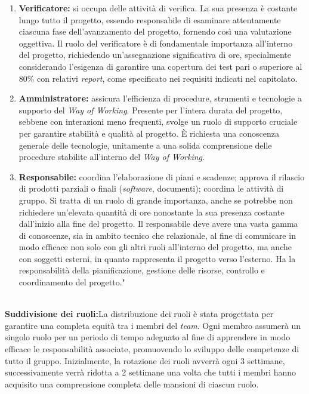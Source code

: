\begin{enumerate}
\item \textbf{Verificatore:} si occupa delle attività di verifica. 
La sua presenza è costante lungo tutto il progetto, essendo responsabile di esaminare attentamente ciascuna 
fase dell'avanzamento del progetto, fornendo così una valutazione oggettiva. 
Il ruolo del verificatore è di fondamentale importanza all'interno del progetto, richiedendo un'assegnazione 
significativa di ore, specialmente considerando l'esigenza di garantire una copertura dei test pari o superiore 
al 80\% con relativi \textit{report}, come specificato nei requisiti indicati nel capitolato.

\item \textbf{Amministratore:} assicura l'efficienza di procedure, strumenti e tecnologie a supporto del 
\textit{Way of Working}.
Presente per l'intera durata del progetto, sebbene con interazioni meno frequenti, svolge un ruolo di 
supporto cruciale per garantire stabilità e qualità al progetto. 
È richiesta una conoscenza generale delle tecnologie, unitamente a una solida comprensione delle 
procedure stabilite all'interno del \textit{Way of Working}.

\item \textbf{Responsabile:} coordina l'elaborazione di piani e scadenze; approva il rilascio di prodotti 
parziali o finali (\textit{software}, documenti); coordina le attività di gruppo.
Si tratta di un ruolo di grande importanza, anche se potrebbe non richiedere un'elevata quantità di ore 
nonostante la sua presenza costante dall'inizio alla fine del progetto.
Il responsabile deve avere una vasta gamma di conoscenze, sia in ambito tecnico che relazionale, 
al fine di comunicare in modo efficace non solo con gli altri ruoli all'interno del progetto, 
ma anche con soggetti esterni, in quanto rappresenta il progetto verso l'esterno.
Ha la responsabilità della pianificazione, gestione delle risorse, controllo e coordinamento del progetto."
\end{enumerate}



\textbf{\\Suddivisione dei ruoli:}La distribuzione dei ruoli è stata progettata per garantire una completa 
equità tra i membri del \textit{team}. 
Ogni membro assumerà un singolo ruolo per un periodo di tempo adeguato al fine di apprendere in modo efficace 
le responsabilità associate, promuovendo lo sviluppo delle competenze di tutto il gruppo. 
Inizialmente, la rotazione dei ruoli avverrà ogni 3 settimane, successivamente verrà ridotta a 2 settimane 
una volta che tutti i membri hanno acquisito una comprensione completa delle mansioni di ciascun ruolo.